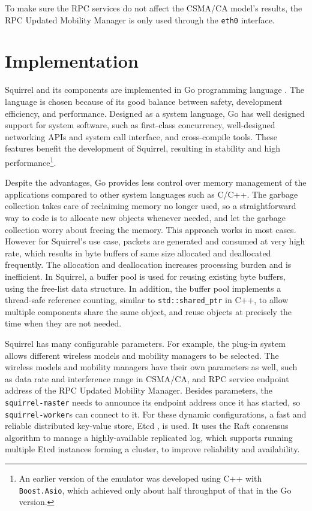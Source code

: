 \documentclass[12pt]{report}
\begin{document}
To make sure the RPC services do not affect the CSMA/CA model's results, the RPC Updated Mobility Manager is only used through the \texttt{eth0} interface.

\section{Implementation}
\label{sec:squirrel_implementation}

Squirrel and its components are implemented in Go programming language \cite{golang}. The language is chosen because of its good balance between safety, development efficiency, and performance. Designed as a system language, Go has well designed support for system software, such as first-class concurrency, well-designed networking APIs and system call interface, and cross-compile tools. These features benefit the development of Squirrel, resulting in stability and high performance\footnote{An earlier version of the emulator was developed using C++ with \texttt{Boost.Asio}, which achieved only about half throughput of that in the Go version.}.

Despite the advantages, Go provides less control over memory management of the applications compared to other system languages such as C/C++. The garbage collection takes care of reclaiming memory no longer used, so a straightforward way to code is to allocate new objects whenever needed, and let the garbage collection worry about freeing the memory. This approach works in most cases. However for Squirrel's use case, packets are generated and consumed at very high rate, which results in byte buffers of same size allocated and deallocated frequently. The allocation and deallocation increases processing burden and is inefficient. In Squirrel, a buffer pool is used for reusing existing byte buffers, using the free-list data structure. In addition, the buffer pool implements a thread-safe reference counting, similar to \texttt{std::shared\_ptr} in C++, to allow multiple components share the same object, and reuse objects at precisely the time when they are not needed.

Squirrel has many configurable parameters. For example, the plug-in system allows different wireless models and mobility managers to be selected. The wireless models and mobility managers have their own parameters as well, such as data rate and interference range in CSMA/CA, and RPC service endpoint address of the RPC Updated Mobility Manager. Besides parameters, the \texttt{squirrel-master} needs to announce its endpoint address once it has started, so \texttt{squirrel-worker}s can connect to it. For these dynamic configurations, a fast and reliable distributed key-value store, Etcd \cite{etcd}, is used. It uses the Raft consensus algorithm \cite{ongaro2014search} to manage a highly-available replicated log, which supports running multiple Etcd instances forming a cluster, to improve reliability and availability.
\end{document}
